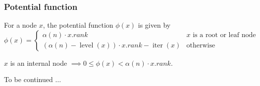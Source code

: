 \subsubsection{Potential function}

\begin{definition}For a node $x$, the potential function $\phi(x)$ is given by
\[ \phi(x) = \begin{cases} \alpha(n) \cdot x.rank & x \textrm{ is a root or leaf node}
\\ (\alpha(n) - \operatorname{level}(x)) \cdot x.rank - \operatorname{iter}(x) & \textrm{otherwise}
\end{cases} \] \end{definition}

\begin{theorem} $x$ is an internal node $\implies 0 \le \phi(x) < \alpha(n) \cdot x.rank$. \end{theorem}

To be continued $\ldots$


